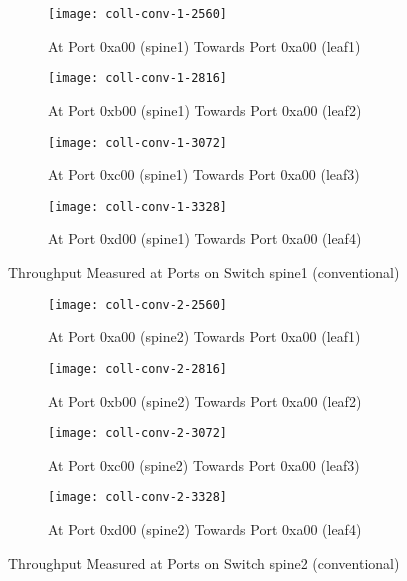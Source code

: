 \begin{figure}
    \centering
    \begin{subfigure}{.45\linewidth}
        \texttt{[image: coll-conv-1-2560]}
        \caption{At Port 0xa00 (spine1) \newline Towards Port 0xa00 (leaf1)}%
        \label{fig:spine1-leaf1-conv}
    \end{subfigure}
    \begin{subfigure}{.45\linewidth}
        \texttt{[image: coll-conv-1-2816]}
        \caption{At Port 0xb00 (spine1) \newline Towards Port 0xa00 (leaf2)}%
        \label{fig:spine1-leaf2-conv}
    \end{subfigure}
    \begin{subfigure}{.45\linewidth}
        \texttt{[image: coll-conv-1-3072]}
        \caption{At Port 0xc00 (spine1) \newline Towards Port 0xa00 (leaf3)}%
        \label{fig:spine1-leaf3-conv}
    \end{subfigure}
    \begin{subfigure}{.45\linewidth}
        \texttt{[image: coll-conv-1-3328]}
        \caption{At Port 0xd00 (spine1) \newline Towards Port 0xa00 (leaf4)}%
        \label{fig:spine1-leaf4-conv}
    \end{subfigure}
    \caption{Throughput Measured at Ports on Switch spine1 (conventional)}%
    \label{fig:coll-spine1-conv}
\end{figure}

\begin{figure}
    \begin{subfigure}{.45\linewidth}
        \texttt{[image: coll-conv-2-2560]}
        \caption{At Port 0xa00 (spine2) \newline Towards Port 0xa00 (leaf1)}%
        \label{fig:spine2-leaf1-conv}
    \end{subfigure}
    \begin{subfigure}{.45\linewidth}
        \texttt{[image: coll-conv-2-2816]}
        \caption{At Port 0xb00 (spine2) \newline Towards Port 0xa00 (leaf2)}%
        \label{fig:spine2-leaf2-conv}
    \end{subfigure}
    \begin{subfigure}{.45\linewidth}
        \texttt{[image: coll-conv-2-3072]}
        \caption{At Port 0xc00 (spine2) \newline Towards Port 0xa00 (leaf3)}%
        \label{fig:spine2-leaf3-conv}
    \end{subfigure}
    \begin{subfigure}{.45\linewidth}
        \texttt{[image: coll-conv-2-3328]}
        \caption{At Port 0xd00 (spine2) \newline Towards Port 0xa00 (leaf4)}%
        \label{fig:spine2-leaf4-conv}
    \end{subfigure}
    \caption{Throughput Measured at Ports on Switch spine2 (conventional)}%
    \label{fig:coll-spine2-conv}
\end{figure}

